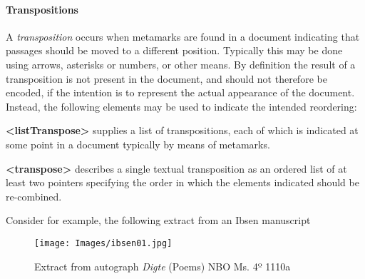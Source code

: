\paragraph[{Transpositions}]{Transpositions}\label{transpo}\par
A \textit{transposition} occurs when metamarks are found in a document indicating that passages should be moved to a different position. Typically this may be done using arrows, asterisks or numbers, or other means. By definition the result of a transposition is not present in the document, and should not therefore be encoded, if the intention is to represent the actual appearance of the document. Instead, the following elements may be used to indicate the intended reordering: 
\begin{sansreflist}
  
\item [\textbf{<listTranspose>}] supplies a list of transpositions, each of which is indicated at some point in a document typically by means of metamarks.
\item [\textbf{<transpose>}] describes a single textual transposition as an ordered list of at least two pointers specifying the order in which the elements indicated should be re-combined.
\end{sansreflist}
\par
Consider for example, the following extract from an Ibsen manuscript \begin{figure}[htbp]
\noindent\noindent\texttt{[image: Images/ibsen01.jpg]}
\caption{Extract from autograph \textit{Digte} (Poems) NBO Ms. 4º 1110a}\end{figure}

